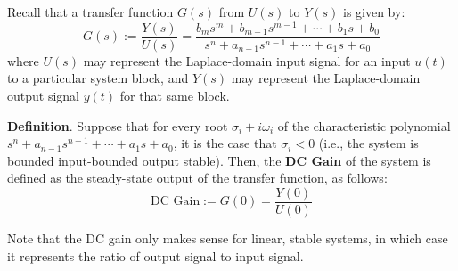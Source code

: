 Recall that a transfer function $G(s)$ from $U(s)$ to $Y(s)$ is given by: \[G(s) := \frac{Y(s)}{U(s)} = \frac{b_m s^m + b_{m-1} s^{m-1} + \cdots + b_1 s + b_0}{s^n + a_{n-1}s^{n-1} + \cdots + a_1 s + a_0}\] where $U(s)$ may represent the Laplace-domain input signal for an input $u(t)$ to a particular system block, and $Y(s)$ may represent the Laplace-domain output signal $y(t)$ for that same block.

\textbf{Definition}. Suppose that for every root $\sigma_i + i\omega_i$ of the characteristic polynomial $s^n + a_{n-1}s^{n-1} + \cdots + a_1 s + a_0$, it is the case that $\sigma_i < 0$ (i.e., the system is bounded input-bounded output stable).  Then, the \textbf{DC Gain} of the system is defined as the steady-state output of the transfer function, as follows: \[\text{DC Gain} := G(0) = \frac{Y(0)}{U(0)}\]

Note that the DC gain only makes sense for linear, stable systems, in which case it represents the ratio of output signal to input signal.

